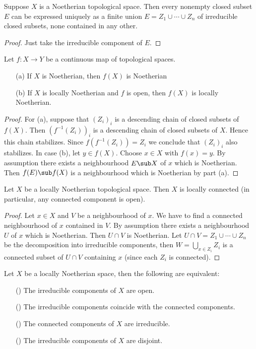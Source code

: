 \begin{proposition}\label{topo Noe irreducible decomp}
Suppose $X$ is a Noetherian topological space. Then every nonempty closed subset $E$ can be expressed uniquely as a finite union $E=Z_1\cup\cdots\cup Z_n$ of irreducible closed subsets, none contained in any other.
\end{proposition}
\begin{proof}
Just take the irreducible component of $E$.
\end{proof}
\begin{proposition}\label{topo space Noe under continuous map}
Let $f:X\to Y$ be a continuous map of topological spaces.
\begin{itemize}
\item[(a)] If $X$ is Noetherian, then $f(X)$ is Noetherian
\item[(b)] If $X$ is locally Noetherian and $f$ is open, then $f(X)$ is locally Noetherian.
\end{itemize}
\end{proposition}
\begin{proof}
For (a), suppose that $(Z_i)_i$ is a descending chain of closed subsets of $f(X)$. Then $(f^{-1}(Z_i))_i$ is a descending chain of closed subsets of $X$. Hence this chain stabilizes. Since $f(f^{-1}(Z_i))=Z_i$ we conclude that $(Z_i)_i$ also stabilizes. In case (b), let $y\in f(X)$. Choose $x\in X$ with $f(x)=y$. By assumption there exists a neighbourhood $E\sub X$ of $x$ which is Noetherian. Then $f(E)\sub f(X)$ is a neighbourhood which is Noetherian by part (a).
\end{proof}
\begin{proposition}\label{topo space local Noe is local connected}
Let $X$ be a locally Noetherian topological space. Then $X$ is locally
connected (in particular, any connected component is open).
\end{proposition}
\begin{proof}
Let $x\in X$ and $V$ be a neighbourhood of $x$. We have to find a connected neighbourhood of $x$ contained in $V$. By assumption there exists a neighbourhood $U$ of $x$ which is Noetherian. Then $U\cap V$ is Noetherian. Let $U\cap V=Z_1\cup\cdots\cup Z_n$ be the decomposition into irreducible components, then $W=\bigcup_{x\in Z_i}Z_i$ is a connected subset of $U\cap V$ containing $x$ (since each $Z_i$ is connected).
\end{proof}
\begin{proposition}\label{topo space locally Noe irre component open iff}
Let $X$ be a locally Noetherian space, then the following are equivalent:
\begin{itemize}
\item[(\rmnum{1})] The irreducible components of $X$ are open.
\item[(\rmnum{2})] The irreducible components coincide with the connected components.
\item[(\rmnum{3})] The connected components of $X$ are irreducible.
\item[(\rmnum{4})] The irreducible components of $X$ are disjoint.
\end{itemize}
\end{proposition}
